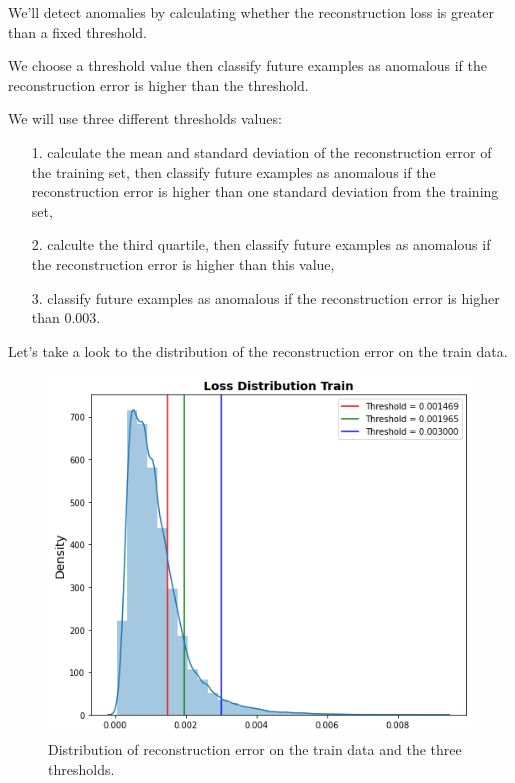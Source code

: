 We'll detect anomalies by calculating whether the reconstruction loss is greater than a fixed threshold.

We choose a threshold value then classify future examples as anomalous if the reconstruction error is higher than the threshold.

We will use three different thresholds values:

\begin{itemize}
  \item[1.] calculate the mean and standard deviation of the reconstruction error of the training set, then classify future examples as anomalous if the reconstruction error is higher than one standard deviation from the training set,
  \item[2.] calculte the third quartile, then classify future examples as anomalous if the reconstruction error is higher than  this value, 
  \item[3.] classify future examples as anomalous if the reconstruction error is higher than  0.003.
\end{itemize}

Let's take a look to the distribution of the reconstruction error on the train data.

\begin{figure}[H]
\centering
  \includegraphics[scale=0.4]{img/task_2/train_loss.png}
  \caption{Distribution of reconstruction error on the train data and the three thresholds.}
  \label{fig: train loss}
\end{figure}

